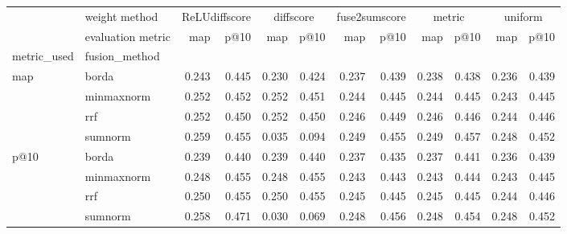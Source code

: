 \begin{tabular}{llrrrrrrrrrr}
\toprule
 & weight method & \multicolumn{2}{c}{ReLUdiffscore} & \multicolumn{2}{c}{diffscore} & \multicolumn{2}{c}{fuse2sumscore} & \multicolumn{2}{c}{metric} & \multicolumn{2}{c}{uniform} \\
 & evaluation metric & map & p@10 & map & p@10 & map & p@10 & map & p@10 & map & p@10 \\
metric_used & fusion_method &  &  &  &  &  &  &  &  &  &  \\
\midrule
\multirow[t]{4}{*}{map} & borda & 0.243 & 0.445 & 0.230 & 0.424 & 0.237 & 0.439 & 0.238 & 0.438 & 0.236 & 0.439 \\
 & minmaxnorm & 0.252 & 0.452 & 0.252 & 0.451 & 0.244 & 0.445 & 0.244 & 0.445 & 0.243 & 0.445 \\
 & rrf & 0.252 & 0.450 & 0.252 & 0.450 & 0.246 & 0.449 & 0.246 & 0.446 & 0.244 & 0.446 \\
 & sumnorm & 0.259 & 0.455 & 0.035 & 0.094 & 0.249 & 0.455 & 0.249 & 0.457 & 0.248 & 0.452 \\
\cline{1-12}
\multirow[t]{4}{*}{p@10} & borda & 0.239 & 0.440 & 0.239 & 0.440 & 0.237 & 0.435 & 0.237 & 0.441 & 0.236 & 0.439 \\
 & minmaxnorm & 0.248 & 0.455 & 0.248 & 0.455 & 0.243 & 0.443 & 0.243 & 0.444 & 0.243 & 0.445 \\
 & rrf & 0.250 & 0.455 & 0.250 & 0.455 & 0.245 & 0.445 & 0.245 & 0.445 & 0.244 & 0.446 \\
 & sumnorm & 0.258 & 0.471 & 0.030 & 0.069 & 0.248 & 0.456 & 0.248 & 0.454 & 0.248 & 0.452 \\
\cline{1-12}
\bottomrule
\end{tabular}
